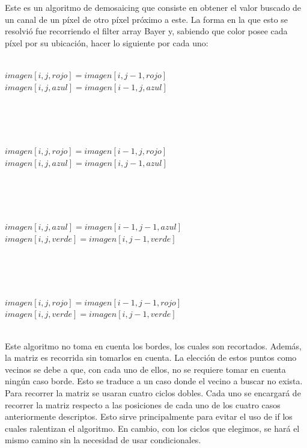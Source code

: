\documentclass[10pt, a4paper]{article}
\begin{document}
Este es un algoritmo de demosaicing que consiste en obtener el valor buscado de un canal de un p\'ixel de otro p\'ixel pr\'oximo a este. La forma en la que esto se resolvi\'o fue recorriendo el filter array Bayer y, sabiendo que color posee cada p\'ixel por su ubicaci\'on, hacer lo siguiente por cada uno:
\ \\
\begin{algorithm}[H]

\ \\
$imagen[i,j,rojo]=imagen[i,j-1,rojo]$\;
$imagen[i,j,azul]=imagen[i-1,j,azul]$\;
\caption{Caso en que estemos en un p\'ixel verde de fila con rojos(Posici\'on i, j de la matriz)}
\end{algorithm} 
\ \\
\ \\
\begin{algorithm}[H]

\ \\
$imagen[i,j,rojo]=imagen[i-1,j,rojo]$\;
$imagen[i,j,azul]=imagen[i,j-1,azul]$\;
\caption{Caso en que estemos en un p\'ixel verde de fila con azules(Posici\'on i, j de la matriz)}
\end{algorithm} 
\ \\
\ \\
\begin{algorithm}[H]

\ \\
$imagen[i,j,azul]=imagen[i-1,j-1,azul]$\;
$imagen[i,j,verde]=imagen[i,j-1,verde]$\;
\caption{Caso en que estemos en un p\'ixel rojo(Posici\'on i, j de la matriz)}
\end{algorithm} 
\ \\
\ \\
\begin{algorithm}[H]

\ \\
$imagen[i,j,rojo]=imagen[i-1,j-1,rojo]$\;
$imagen[i,j,verde]=imagen[i,j-1,verde]$\;
\caption{Caso en que estemos en un p\'ixel azul(Posici\'on i, j de la matriz)}
\end{algorithm} 
\ \\

Este algoritmo no toma en cuenta los bordes, los cuales son recortados. Adem\'as, la matriz es recorrida sin tomarlos en cuenta. La elecci\'on de estos puntos como vecinos se debe a que, con cada uno de ellos, no se requiere tomar en cuenta ning\'un caso borde. Esto se traduce a un caso donde el vecino a buscar no exista. 
Para recorrer la matriz se usaran cuatro ciclos dobles. Cada uno se encargar\'a de recorrer la matriz respecto a las posiciones de cada uno de los cuatro casos anteriormente descriptos. Esto sirve principalmente para evitar el uso de if los cuales ralentizan el algoritmo. En cambio, con los ciclos que elegimos, se har\'a el mismo camino sin la necesidad de usar condicionales.
\end{document}
